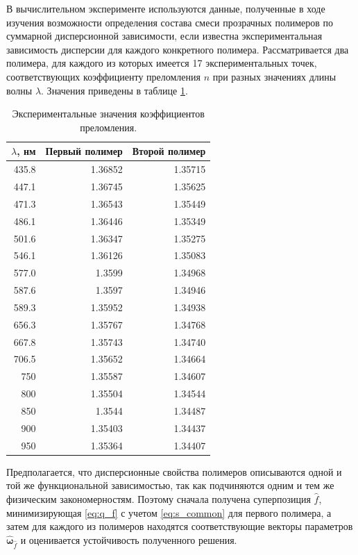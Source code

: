 \documentclass[12pt,a4paper]{article}
\begin{document}
В вычислительном эксперименте используются данные, полученные в ходе
изучения возможности определения состава смеси прозрачных
полимеров по суммарной дисперсионной зависимости, если известна экспериментальная
зависимость дисперсии для каждого конкретного полимера. Рассматривается два
полимера, для каждого из которых имеется 17 экспериментальных точек,
соответствующих коэффициенту преломления $n$ при разных значениях длины волны $\lambda$.
Значения приведены в таблице \ref{tabl:source_data}.

\begin{table}[h]
  \footnotesize
  \begin{tabular}{| r | r | r |} \hline
	$\lambda$, нм	& Первый полимер & Второй полимер \\ \hline
	435.8 & 1.36852 & 1.35715 \\ \hline
	447.1 & 1.36745 & 1.35625 \\ \hline
	471.3 & 1.36543 & 1.35449 \\ \hline
	486.1 & 1.36446 & 1.35349 \\ \hline
	501.6 & 1.36347 & 1.35275 \\ \hline
	546.1 & 1.36126 & 1.35083 \\ \hline
	577.0 & 1.3599 & 1.34968 \\ \hline
	587.6 & 1.3597 & 1.34946 \\ \hline
	589.3 & 1.35952 & 1.34938 \\ \hline
	656.3 & 1.35767 & 1.34768 \\ \hline
	667.8 & 1.35743 & 1.34740 \\ \hline
	706.5 & 1.35652 & 1.34664 \\ \hline
	750 & 1.35587 & 1.34607 \\ \hline
	800 & 1.35504 & 1.34544 \\ \hline
	850 & 1.3544 & 1.34487 \\ \hline
	900 & 1.35403 & 1.34437 \\ \hline
	950 & 1.35364 & 1.34407 \\ \hline
  \end{tabular}
  \caption{Экспериментальные значения коэффициентов преломления.}
  \label{tabl:source_data}
\end{table}

Предполагается, что дисперсионные свойства полимеров описываются одной и той
же функциональной зависимостью, так как подчиняются одним и тем же физическим
закономерностям. Поэтому сначала получена суперпозиция $\hat{f}$,
минимизирующая \eqref{eq:q_f} с учетом \eqref{eq:s_common} для первого полимера,
а затем для каждого из полимеров находятся соответствующие векторы параметров
$\hat{\boldsymbol{\omega}}_{\hat{f}}$ и оценивается устойчивость полученного решения.
\end{document}
